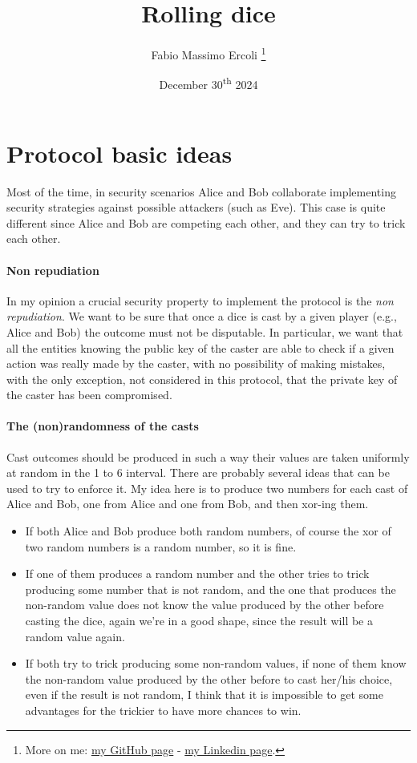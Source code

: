 \documentclass{article}
\title{Rolling dice}
\author{Fabio Massimo Ercoli
	\footnote{
		More on me:
		\href{https://github.com/fax4ever}{my GitHub page} -
		\href{https://www.linkedin.com/in/fabioercoli}{my Linkedin page}.
}}
\date{December 30\textsuperscript{th} 2024}
\begin{document}
\maketitle
\thispagestyle{empty}

\section{Protocol basic ideas}

Most of the time, in security scenarios Alice and Bob collaborate
implementing security strategies against possible attackers (such as Eve).
This case is quite different since Alice and Bob are competing each other,
and they can try to trick each other.

\paragraph{Non repudiation}

In my opinion a crucial security property to implement the protocol is 
the \emph{non repudiation}. We want to be sure that once a dice is cast
by a given player (e.g., Alice and Bob) the outcome must not be disputable.
In particular, we want that all the entities knowing the public key of the caster
are able to check if a given action was really made by the caster,
with no possibility of making mistakes, with the only exception,
not considered in this protocol, that the private key of the caster
has been compromised.

\paragraph{The (non)randomness of the casts}

Cast outcomes should be produced in such a way 
their values are taken uniformly at random in the 1 to 6 interval.
There are probably several ideas that can be used to 
try to enforce it.
My idea here is to produce two numbers for each cast
of Alice and Bob, one from Alice and one from Bob, and then
xor-ing them.

\begin{itemize}
	\item If both Alice and Bob produce both random numbers, of course
	the xor of two random numbers is a random number, so it is fine.
	\item If one of them produces a random number and the other tries
	to trick producing some number that is not random, and the one
	that produces the non-random value does not know the value
	produced by the other before casting the dice, again we're in
	a good shape, since the result will be a random value again.
	\item If both try to trick producing some non-random values,
	if none of them know the non-random value produced 
	by the other before to cast her/his choice, even if the result
	is not random, I think that it is impossible to get some
	advantages for the trickier to have more chances to win.
\end{itemize}
\end{document}
